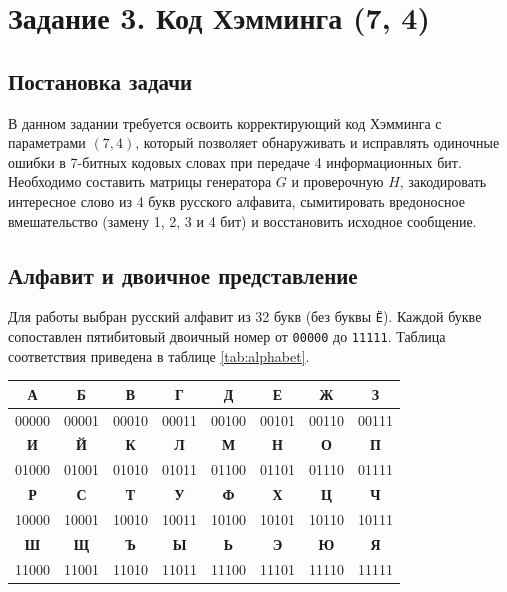 \section{Задание 3. Код Хэмминга (7, 4)}

\subsection{Постановка задачи}
В данном задании требуется освоить корректирующий код Хэмминга с параметрами $(7, 4)$, который позволяет обнаруживать и исправлять одиночные ошибки в 7-битных кодовых словах при передаче 4 информационных бит. Необходимо составить матрицы генератора $G$ и проверочную $H$, закодировать интересное слово из 4 букв русского алфавита, сымитировать вредоносное вмешательство (замену 1, 2, 3 и 4 бит) и восстановить исходное сообщение.

\subsection{Алфавит и двоичное представление}
Для работы выбран русский алфавит из 32 букв (без буквы \texttt{Ё}). Каждой букве сопоставлен пятибитовый двоичный номер от \texttt{00000} до \texttt{11111}. Таблица соответствия приведена в таблице \ref{tab:alphabet}.

\begin{center}
\small
\begin{tabular}{|c|c|c|c|c|c|c|c|}
\hline
\textbf{А} & \textbf{Б} & \textbf{В} & \textbf{Г} & \textbf{Д} & \textbf{Е} & \textbf{Ж} & \textbf{З} \\
\hline
00000 & 00001 & 00010 & 00011 & 00100 & 00101 & 00110 & 00111 \\
\hline
\textbf{И} & \textbf{Й} & \textbf{К} & \textbf{Л} & \textbf{М} & \textbf{Н} & \textbf{О} & \textbf{П} \\
\hline
01000 & 01001 & 01010 & 01011 & 01100 & 01101 & 01110 & 01111 \\
\hline
\textbf{Р} & \textbf{С} & \textbf{Т} & \textbf{У} & \textbf{Ф} & \textbf{Х} & \textbf{Ц} & \textbf{Ч} \\
\hline
10000 & 10001 & 10010 & 10011 & 10100 & 10101 & 10110 & 10111 \\
\hline
\textbf{Ш} & \textbf{Щ} & \textbf{Ъ} & \textbf{Ы} & \textbf{Ь} & \textbf{Э} & \textbf{Ю} & \textbf{Я} \\
\hline
11000 & 11001 & 11010 & 11011 & 11100 & 11101 & 11110 & 11111 \\
\hline
\end{tabular}
\end{center}
\label{tab:alphabet}

